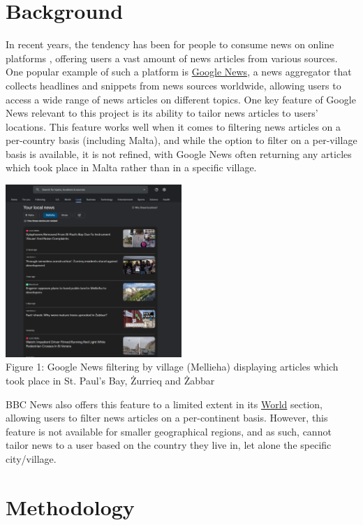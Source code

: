 \documentclass[a4paper, oneside, 11pt]{article}
\begin{document}
\begin{multicols*}{2}
  \section{Background}
  In recent years, the tendency has been for people to consume news on online platforms \cite{bennett2008digital} \cite{ripolles2012beyond}, offering users a vast amount of news articles from various sources. One popular example of such a platform is \href{https://news.google.com/}{Google News}, a news aggregator that collects headlines and snippets from news sources worldwide, allowing users to access a wide range of news articles on different topics. One key feature of Google News relevant to this project is its ability to tailor news articles to users' locations. This feature works well when it comes to filtering news articles on a per-country basis (including Malta), and while the option to filter on a per-village basis is available, it is not refined, with Google News often returning any articles which took place in Malta rather than in a specific village.

  \begin{center}
    \includegraphics[width=0.5\textwidth]{./figures/googlenewsmellieha.png} \\
    Figure 1: Google News filtering by village (Mellieha) displaying articles which took place in St. Paul's Bay, Żurrieq and Żabbar
  \end{center}


  BBC News also offers this feature to a limited extent in its \href{https://www.bbc.com/news/world}{World} section, allowing users to filter news articles on a per-continent basis. However, this feature is not available for smaller geographical regions, and as such, cannot tailor news to a user based on the country they live in, let alone the specific city/village.


  \section{Methodology}

\end{multicols*}
\end{document}

